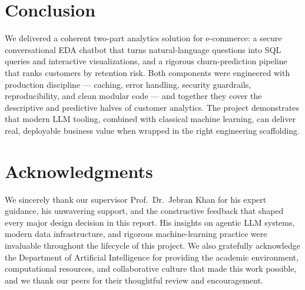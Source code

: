 \documentclass[11pt,a4paper]{article}
\begin{document}
\section{Conclusion}

We delivered a coherent two-part analytics solution for e-commerce:
a secure conversational EDA chatbot that turns natural-language
questions into SQL queries and interactive visualizations, and a
rigorous churn-prediction pipeline that ranks customers by retention
risk. Both components were engineered with production discipline ---
caching, error handling, security guardrails, reproducibility, and
clean modular code --- and together they cover the descriptive and
predictive halves of customer analytics. The project demonstrates
that modern LLM tooling, combined with classical machine learning,
can deliver real, deployable business value when wrapped in the right
engineering scaffolding.

\section*{Acknowledgments}

We sincerely thank our supervisor Prof.~Dr.~Jebran Khan for his
expert guidance, his unwavering support, and the constructive feedback
that shaped every major design decision in this report. His insights
on agentic LLM systems, modern data infrastructure, and rigorous
machine-learning practice were invaluable throughout the lifecycle of
this project. We also gratefully acknowledge the Department of
Artificial Intelligence for providing the academic environment,
computational resources, and collaborative culture that made this
work possible, and we thank our peers for their thoughtful review and
encouragement.
\end{document}
